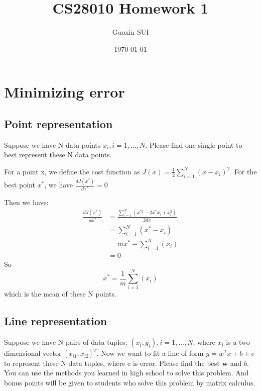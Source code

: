 \documentclass{article}
\title{CS28010 Homework 1}
\author{Guoxin SUI}
\date{\today}
\newenvironment{answer}{\par\color{ForestGreen}}{\par}
\begin{document}
\maketitle

\section{Minimizing error}
\subsection{Point representation}
Suppose we have N data points $x_i, i = 1,... , N$. Please find one single point to best represent these N data points.

\begin{answer}

For a point x, we define the cost function as $J(x)=\frac{1}{2}\sum_{i=1}^N(x-x_i)^2$.
For the best point $x^*$, we have $\frac{dJ(x^*)}{dx^*} = 0$

Then we have: \begin{align*}
    \frac{dJ(x^*)}{dx^*} &=  \frac{\sum_{i=1}^N(x^{*2}-2x^*x_i+x_i^2)}{2dx} \\
                     &= \sum_{i=1}^N(x^*-x_i) \\
                     &= mx^* - \sum_{i=1}^N(x_i) \\
                     &= 0
     \end{align*}
So $$x^* = \frac{1}{m}\sum_{i=1}^N(x_i)$$ which is the mean of these N points.
\end{answer}

\subsection{Line representation}
 Suppose we have N pairs of data tuples: $(x_i, y_i), i = 1, ..., N$, where $x_i$ is a two dimensional vector $[x_{i1}, x_{i2}]^T$. Now we want to fit a line of form $y = w^T x + b + e$ to represent these N
data tuples, where e is error. Please find the best $\textbf{w}$ and $b$. You can use the methods you
learned in high school to solve this problem. And bonus points will be given to students
who solve this problem by matrix calculus.
\end{document}
